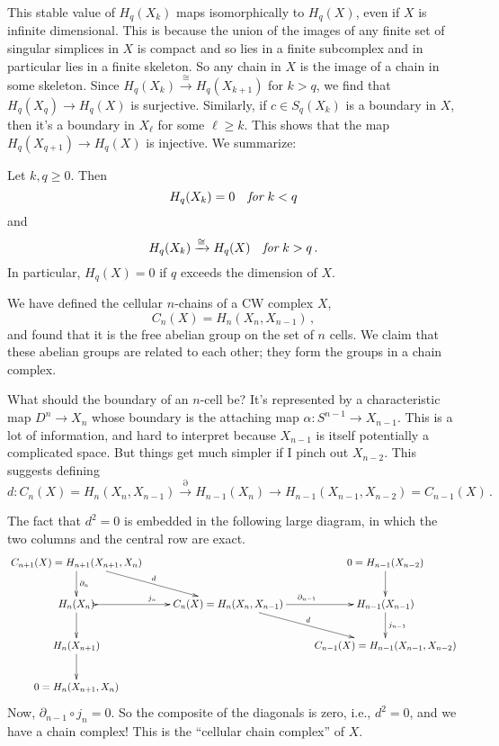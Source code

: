 This stable value of $H_q(X_k)$ maps isomorphically to $H_q(X)$, 
even if $X$ is infinite 
dimensional. This is because the union of the images of any finite set of 
singular simplices in $X$ is compact and so lies in a finite subcomplex and in
particular lies in a finite skeleton. So any chain in $X$ is the image of 
a chain in some skeleton. Since $H_q(X_k)\xrightarrow{\cong}H_q(X_{k+1})$ for 
$k>q$, we find that $H_q(X_q)\to H_q(X)$ is surjective. Similarly, 
if $c\in S_q(X_k)$ is a boundary in $X$, then it's a boundary in $X_\ell$ 
for some $\ell\geq k$. This shows that the map $H_q(X_{q+1})\to H_q(X)$ is
injective. We summarize:
\begin{prop} 
Let $k,q\geq 0$. Then 
\[
H_q(X_k)=0\quad\hbox{\em for}\,\,k<q
\]
and
\[
H_q(X_k)\xrightarrow{\cong}H_q(X)\quad\hbox{\em for}\,\,k>q\,.
\]
In particular, $H_q(X)=0$ if $q$ exceeds the dimension of $X$. 
\end{prop}

We have defined the cellular $n$-chains of a CW complex $X$,
\[
C_n(X)=H_n(X_n,X_{n-1})\,,
\]
and found that it is the free abelian group on the set of $n$ cells. 
We claim that these abelian groups are related to each other; they form 
the groups in a chain complex. 

What should the boundary of an $n$-cell be? It's represented by 
a characteristic map $D^n\to X_n$ whose boundary is the attaching map 
$\alpha:S^{n-1}\to X_{n-1}$.
This is a lot of information, and hard to interpret because $X_{n-1}$ is itself
potentially a complicated space. But things get much simpler if I pinch out
$X_{n-2}$. This suggests defining 
\[
d:C_n(X)=H_n(X_n,X_{n-1})\xrightarrow{\partial} H_{n-1}(X_n)\rightarrow 
H_{n-1}(X_{n-1},X_{n-2})=C_{n-1}(X)\,.
\]

The fact that $d^2=0$ is embedded in the following large diagram, in which 
the two columns and the central row are exact. 
\begin{equation*}
\xymatrix{C_{n+1}(X)= H_{n+1}(X_{n+1},X_n)\ar[d]^{\partial_n}\ar[dr]^d & & 0= H_{n-1}(X_{n-2})\ar[d]\\
 H_n(X_n)\ar@{>->}[r]^{j_n}\ar[d] & C_n(X)= H_n(X_n,X_{n-1})\ar[r]^{\partial_{n-1}}\ar[dr]^d & H_{n-1}(X_{n-1})\ar[d]^{j_{n-1}}\\
 H_n(X_{n+1})\ar[d] & & C_{n-1}(X)= H_{n-1}(X_{n-1},X_{n-2})\\
0 = H_n(X_{n+1},X_n)}
\end{equation*}
Now, $\partial_{n-1}\circ j_n=0$. So the composite of the diagonals is zero, i.e., $d^2=0$, and we have a chain complex! This is the ``cellular chain complex'' of $X$. 

